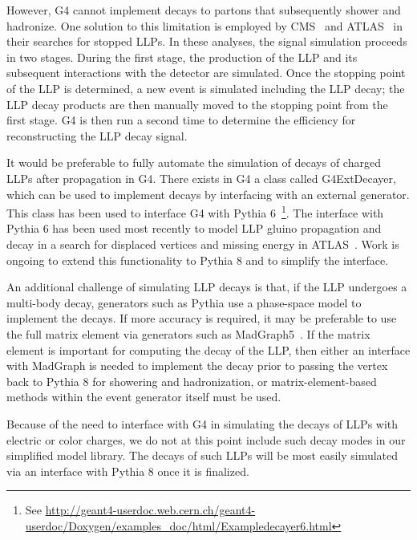 However, G4 cannot implement decays to partons that subsequently shower and hadronize.
One solution to this limitation is employed by CMS~\cite{Khachatryan:2015jha,Sirunyan:2017sbs} and ATLAS~\cite{Aad:2013gva} in their searches for stopped LLPs.
In these analyses, the signal simulation proceeds in two stages.
During the first stage, the production of the LLP and its subsequent interactions with the detector are simulated.
Once the stopping point of the LLP is determined, a new event is simulated including the LLP decay; the LLP decay products are then manually moved to the stopping point from the first stage.
G4 is then run a second time to determine the efficiency for reconstructing the LLP decay signal.

It would be preferable to fully automate the simulation of decays of charged LLPs after propagation in G4.
There exists in G4 a class called G4ExtDecayer, which can be used to implement decays by interfacing with an external generator.
This class has been used to interface G4 with Pythia 6~\footnote{See \url{http://geant4-userdoc.web.cern.ch/geant4-userdoc/Doxygen/examples_doc/html/Exampledecayer6.html}}.
The interface with Pythia 6 has been used most recently to model LLP gluino propagation and decay in a search for displaced vertices and missing energy in ATLAS~\cite{Aaboud:2017iio}.
Work is ongoing to extend this functionality to Pythia 8 and to simplify the interface.

An additional challenge of simulating LLP decays is that, if the LLP undergoes a multi-body decay, generators such as Pythia use a phase-space model to implement the decays. If more accuracy is required, it may be preferable to use the full matrix element via generators such as MadGraph5~\cite{Alwall:2011uj,Alwall:2014hca}. If the matrix element is important for computing the decay of the LLP, then either an interface with MadGraph is needed to implement the decay prior to passing the vertex back to Pythia 8 for showering and hadronization, or matrix-element-based methods within the event generator itself must be used.

Because of the need to interface with G4 in simulating the decays of LLPs with electric or color charges, we do not at this point include such decay modes in our simplified model library.
The decays of such LLPs will be most easily simulated via an interface with Pythia 8 once it is finalized.

